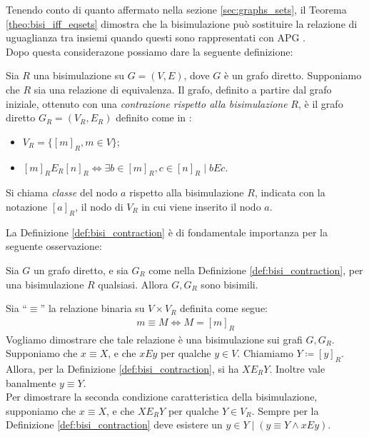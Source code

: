 Tenendo conto di quanto affermato nella sezione \ref{sec:graphs_sets}, il Teorema \ref{theo:bisi_iff_eqsets} dimostra che la bisimulazione può sostituire la relazione di uguaglianza tra insiemi quando questi sono rappresentati con APG \cite{dovier}.\\

Dopo questa considerazone possiamo dare la seguente definizione:
\begin{definition}
    \label{def:bisi_contraction}
    Sia $R$ una bisimulazione su $G = (V,E)$, dove $G$ è un grafo diretto. Supponiamo che $R$ sia una relazione di equivalenza. Il grafo, definito a partire dal grafo iniziale, ottenuto con una \emph{contrazione rispetto alla bisimulazione} $R$, è il grafo diretto $G_R = (V_R, E_R)$ definito come in \cite{gentilini}:
    \begin{itemize}
        \item $V_R = \{[m]_R, m \in V\}$;
        \item $[m]_R E_R [n]_R \iff \exists b \in [m]_R, c \in [n]_R \mid b E c$.
    \end{itemize}
    Si chiama \emph{classe} del nodo $a$ rispetto alla bisimulazione $R$, indicata con la notazione $[a]_R$, il nodo di $V_R$ in cui viene inserito il nodo $a$.
\end{definition}
La Definizione \ref{def:bisi_contraction} è di fondamentale importanza per la seguente osservazione:
\begin{proposition}
    Sia $G$ un grafo diretto, e sia $G_R$ come nella Definizione \ref{def:bisi_contraction}, per una bisimulazione $R$ qualsiasi. Allora $G, G_R$ sono bisimili.
    \label{prop:bisi_cont_bisi}
\end{proposition}
\begin{proof2}
    Sia ``$\equiv$'' la relazione binaria su $V\times V_R$ definita come segue:
    \begin{gather*}
        m \equiv M \iff M = [m]_R
    \end{gather*}
    Vogliamo dimostrare che tale relazione è una bisimulazione sui grafi $G, G_R$.\\
    Supponiamo che $x \equiv X$, e che $x E y$ per qualche $y \in V$. Chiamiamo $Y \coloneqq [y]_R$. Allora, per la Definizione \ref{def:bisi_contraction}, si ha $X E_R Y$. Inoltre vale banalmente $y \equiv Y$.\\
    Per dimostrare la seconda condizione caratteristica della bisimulazione, supponiamo che $x \equiv X$, e che $X E_R Y$ per qualche $Y \in V_R$. Sempre per la Definizione \ref{def:bisi_contraction} deve esistere un $y \in Y \mid (y \equiv Y \land x E y)$.
\end{proof2}
